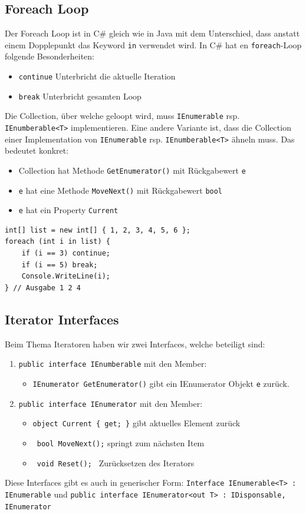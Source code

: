 \documentclass[
a4paper,
oneside,
10pt,
fleqn,
headsepline,
toc=listofnumbered, 
bibliography=totocnumbered]{scrartcl}
\begin{document}
\subsection{Foreach Loop}
Der Foreach Loop ist in C\# gleich wie in Java mit dem Unterschied, dass anstatt einem Dopplepunkt das Keyword \lstinline|in| verwendet wird. In C\# hat en \lstinline|foreach|-Loop folgende Besonderheiten:
\begin{itemize}
	\item \lstinline|continue| Unterbricht die aktuelle Iteration
	\item \lstinline|break| Unterbricht gesamten Loop
\end{itemize}
Die Collection, über welche geloopt wird, muss \lstinline|IEnumerable| rsp. \lstinline|IEnumberable<T>| implementieren. Eine andere Variante ist, dass die Collection einer Implementation von \lstinline|IEnumerable| rsp. \lstinline|IEnumberable<T>| ähneln muss. Das bedeutet konkret:
\begin{itemize}
	\item Collection hat Methode \lstinline|GetEnumerator()| mit Rückgabewert \lstinline|e|
	\item \lstinline|e| hat eine Methode \lstinline|MoveNext()| mit Rückgabewert \lstinline|bool|
	\item \lstinline|e| hat ein Property \lstinline|Current|
\end{itemize}

\begin{lstlisting}
int[] list = new int[] { 1, 2, 3, 4, 5, 6 };
foreach (int i in list) {
	if (i == 3) continue;
	if (i == 5) break;
	Console.WriteLine(i);
} // Ausgabe 1 2 4
\end{lstlisting}

\subsection{Iterator Interfaces}
Beim Thema Iteratoren haben wir zwei Interfaces, welche beteiligt sind:
\begin{enumerate}
	\item \lstinline|public interface IEnumberable| mit den Member:
	      \begin{itemize}
		      \item \lstinline|IEnumerator GetEnumerator()| gibt ein IEnumerator Objekt \lstinline|e| zurück.
	      \end{itemize}
	\item \lstinline|public interface IEnumerator| mit den Member:
	      \begin{itemize}
		      \item \lstinline|object Current { get; }| gibt aktuelles Element zurück
		      \item \lstinline| bool MoveNext();| springt zum nächsten Item
		      \item \lstinline| void Reset(); | Zurücksetzen des Iterators
	      \end{itemize}
\end{enumerate}
Diese Interfaces gibt es auch in generischer Form: \lstinline|Interface IEnumerable<T> : IEnumerable| und \lstinline|public interface IEnumerator<out T> : IDisponsable, IEnumerator|
\end{document}
